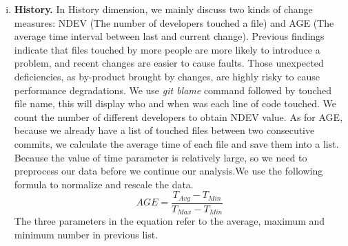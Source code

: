 \begin{enumerate}[(i)]
	\item \noindent
	\textbf{History.}
	In History dimension, we mainly discuss two kinds of change measures: NDEV (The number of developers touched a file) and AGE (The average time interval between last and current change). Previous findings indicate that files touched by more people are more likely to introduce a problem\cite{matsumoto2010analysis}, and recent changes are easier to cause faults\cite{eick2001does}. Those unexpected deficiencies, as by-product brought by changes, are highly risky to cause performance degradations. We use \textit{git blame} command followed by touched file name, this will display who and when was each line of code touched. We count the number of different developers to obtain NDEV value. As for AGE, because we already have a list of touched files between two consecutive commits, we calculate the average time of each file and save them into a list. Because the value of time parameter is relatively large, so we need to preprocess our data before we continue our analysis.We use the following formula to normalize and rescale the data.
	\begin{equation}
		AGE = \frac{T_{Avg}-T_{Min}}{T_{Max}-T_{Min}}
	\end{equation}
	The three parameters in the equation refer to the average, maximum and minimum number in previous list. 
	

\end{enumerate}
